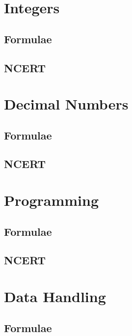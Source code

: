 \documentclass[journal]{IEEEtran}
\begin{document}
\newpage


\tableofcontents

\newpage
\onecolumn


\renewcommand{\thefigure}{\theenumi}
\renewcommand{\thetable}{\theenumi}

\section{Integers}
\subsection{Formulae}

\subsection{NCERT}

\section{Decimal Numbers}
\subsection{Formulae}

\subsection{NCERT}

\section{Programming}
\subsection{Formulae}

\subsection{NCERT}

\section{Data Handling}
\subsection{Formulae}

\end{document}
